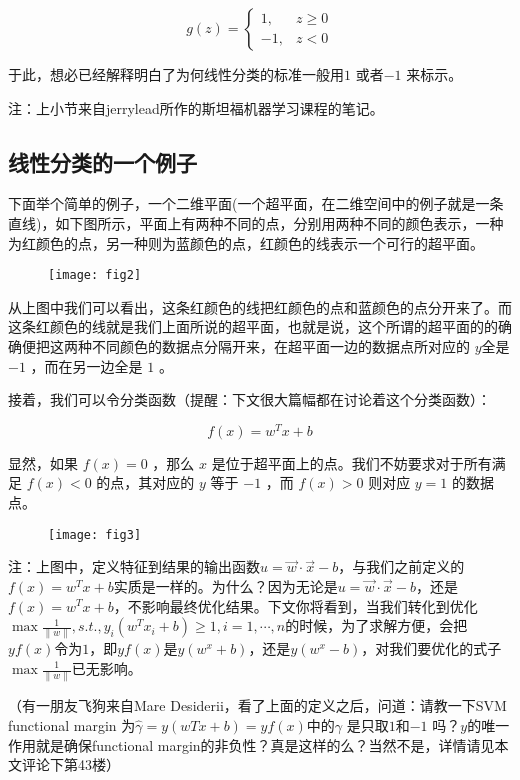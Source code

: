 \documentclass[a4paper,12pt]{article}
\begin{document}
\begin{equation}
g(z)=\left\{\begin{array}{lr}
1, &z\geqslant0\\
-1, &z<0
\end{array}\right.
\end{equation}

于此，想必已经解释明白了为何线性分类的标准一般用$1$ 或者$-1$ 来标示。

注：上小节来自jerrylead所作的斯坦福机器学习课程的笔记。

\subsection{线性分类的一个例子}
下面举个简单的例子，一个二维平面(一个超平面，在二维空间中的例子就是一条直线)，如下图所示，平面上有两种不同的点，分别用两种不同的颜色表示，一种为红颜色的点，另一种则为蓝颜色的点，红颜色的线表示一个可行的超平面。
\begin{figure}[H]
\centering
\texttt{[image: fig2]}
\end{figure}

从上图中我们可以看出，这条红颜色的线把红颜色的点和蓝颜色的点分开来了。而这条红颜色的线就是我们上面所说的超平面，也就是说，这个所谓的超平面的的确确便把这两种不同颜色的数据点分隔开来，在超平面一边的数据点所对应的 $y$全是 $-1$ ，而在另一边全是 $1$ 。

接着，我们可以令分类函数（提醒：下文很大篇幅都在讨论着这个分类函数）：

\begin{equation}
f(x)=w^Tx+b
\end{equation}

显然，如果 $f(x)=0$ ，那么 $x$ 是位于超平面上的点。我们不妨要求对于所有满足 $f(x)<0$ 的点，其对应的 $y$ 等于 $-1$ ，而 $f(x)>0$ 则对应 $y=1$ 的数据点。

\begin{figure}[H]
\centering
\texttt{[image: fig3]}
\end{figure}

注：上图中，定义特征到结果的输出函数$u=\vec w \cdot \vec x -b$，与我们之前定义的$f(x)=w^Tx+b$实质是一样的。为什么？因为无论是$u=\vec w \cdot \vec x -b$，还是$f(x)=w^Tx+b$，不影响最终优化结果。下文你将看到，当我们转化到优化$\max\frac{1}{\|w\|},s.t.,y_i(w^Tx_i+b)\geq1,i=1,\cdots ,n$的时候，为了求解方便，会把$yf(x)$令为$1$，即$yf(x)$是$y(w^x + b)$，还是$y(w^x - b)$，对我们要优化的式子$\max\frac{1}{\|w\|}$已无影响。

（有一朋友飞狗来自Mare Desiderii，看了上面的定义之后，问道：请教一下SVM functional margin 为$ \widehat{\gamma}=y(wTx+b)=yf(x)$中的$\gamma$
是只取$1$和$-1$ 吗？$y$的唯一作用就是确保functional margin的非负性？真是这样的么？当然不是，详情请见本文评论下第43楼）
\end{document}
